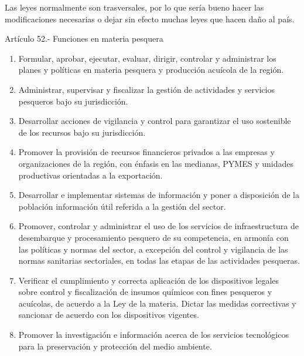 \documentclass[
  letterpaper,
  DIV=11,
  numbers=noendperiod]{scrartcl}
\providecommand{\tightlist}{%
  \setlength{\itemsep}{0pt}\setlength{\parskip}{0pt}}\usepackage{longtable,booktabs,array}
\begin{document}
Las leyes normalmente son trasversales, por lo que sería bueno hacer las
modificaciones necesarias o dejar sin efecto muchas leyes que hacen daño
al país.

Artículo 52.- Funciones en materia pesquera

\begin{enumerate}
\def\labelenumi{\alph{enumi})}
\tightlist
\item
  Formular, aprobar, ejecutar, evaluar, dirigir, controlar y administrar
  los planes y políticas en materia pesquera y producción acuícola de la
  región.
\item
  Administrar, supervisar y fiscalizar la gestión de actividades y
  servicios pesqueros bajo su jurisdicción.
\item
  Desarrollar acciones de vigilancia y control para garantizar el uso
  sostenible de los recursos bajo su jurisdicción.
\item
  Promover la provisión de recursos financieros privados a las empresas
  y organizaciones de la región, con énfasis en las medianas, PYMES y
  unidades productivas orientadas a la exportación.
\item
  Desarrollar e implementar sistemas de información y poner a
  disposición de la población información útil referida a la gestión del
  sector.
\item
  Promover, controlar y administrar el uso de los servicios de
  infraestructura de desembarque y procesamiento pesquero de su
  competencia, en armonía con las políticas y normas del sector, a
  excepción del control y vigilancia de las normas sanitarias
  sectoriales, en todas las etapas de las actividades pesqueras.
\item
  Verificar el cumplimiento y correcta aplicación de los dispositivos
  legales sobre control y fiscalización de insumos químicos con fines
  pesqueros y acuícolas, de acuerdo a la Ley de la materia. Dictar las
  medidas correctivas y sancionar de acuerdo con los dispositivos
  vigentes.
\item
  Promover la investigación e información acerca de los servicios
  tecnológicos para la preservación y protección del medio ambiente.
\end{enumerate}
\end{document}
